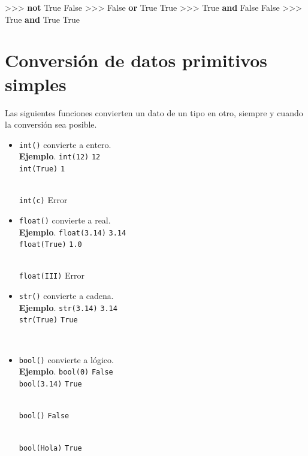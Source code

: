 \documentclass[
  spanish,
  a4paper,
]{scrreport}
\newenvironment{Shaded}{\begin{snugshade}}{\end{snugshade}}
\newcommand{\KeywordTok}[1]{\textcolor[rgb]{0.00,0.23,0.31}{\textbf{#1}}}
\newcommand{\OperatorTok}[1]{\textcolor[rgb]{0.37,0.37,0.37}{#1}}
\newcommand{\VariableTok}[1]{\textcolor[rgb]{0.07,0.07,0.07}{#1}}
\providecommand{\tightlist}{%
  \setlength{\itemsep}{0pt}\setlength{\parskip}{0pt}}
\begin{document}
\begin{Shaded}
\begin{Highlighting}[]
\OperatorTok{\textgreater{}\textgreater{}\textgreater{}} \KeywordTok{not} \VariableTok{True}
\VariableTok{False}
\OperatorTok{\textgreater{}\textgreater{}\textgreater{}} \VariableTok{False} \KeywordTok{or} \VariableTok{True}
\VariableTok{True}
\OperatorTok{\textgreater{}\textgreater{}\textgreater{}} \VariableTok{True} \KeywordTok{and} \VariableTok{False}
\VariableTok{False}
\OperatorTok{\textgreater{}\textgreater{}\textgreater{}} \VariableTok{True} \KeywordTok{and} \VariableTok{True}
\VariableTok{True}
\end{Highlighting}
\end{Shaded}

\section{Conversión de datos primitivos
simples}\label{conversiuxf3n-de-datos-primitivos-simples}

Las siguientes funciones convierten un dato de un tipo en otro, siempre
y cuando la conversión sea posible.

\begin{itemize}
\tightlist
\item
  \texttt{int()} convierte a entero.\\
  \textbf{Ejemplo}. \texttt{int(\textquotesingle{}12\textquotesingle{})}
  \texttt{12}\\
  \texttt{int(True)} \texttt{1}\strut \\
  \texttt{int(\textquotesingle{}c\textquotesingle{})} Error
\item
  \texttt{float()} convierte a real.\\
  \textbf{Ejemplo}.
  \texttt{float(\textquotesingle{}3.14\textquotesingle{})}
  \texttt{3.14}\\
  \texttt{float(True)} \texttt{1.0}\strut \\
  \texttt{float(\textquotesingle{}III\textquotesingle{})} Error
\item
  \texttt{str()} convierte a cadena.\\
  \textbf{Ejemplo}. \texttt{str(3.14)}
  \texttt{\textquotesingle{}3.14\textquotesingle{}}\\
  \texttt{str(True)}
  \texttt{\textquotesingle{}True\textquotesingle{}}\strut \\
\item
  \texttt{bool()} convierte a lógico.\\
  \textbf{Ejemplo}. \texttt{bool(\textquotesingle{}0\textquotesingle{})}
  \texttt{False}\\
  \texttt{bool(\textquotesingle{}3.14\textquotesingle{})}
  \texttt{True}\strut \\
  \texttt{bool(\textquotesingle{}\textquotesingle{})}
  \texttt{False}\strut \\
  \texttt{bool(\textquotesingle{}Hola\textquotesingle{})} \texttt{True}
\end{itemize}
\end{document}
